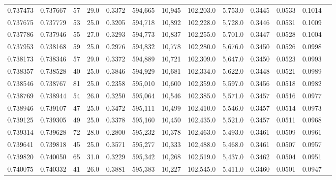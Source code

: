 \begin{tabular}{rrrrrrrrrrrrr}
0.737473 & 0.737667 &    57 & 29.0 &                                     0.3372 & 594,665 &  10,945 & 102,203.0 &   5,753.0 & 0.3445 & 0.0533 & 0.1014 \\
0.737675 & 0.737779 &    53 & 25.0 &                                     0.3205 & 594,718 &  10,892 & 102,228.0 &   5,728.0 & 0.3446 & 0.0531 & 0.1009 \\
0.737786 & 0.737946 &    55 & 27.0 &                                     0.3293 & 594,773 &  10,837 & 102,255.0 &   5,701.0 & 0.3447 & 0.0528 & 0.1004 \\
0.737953 & 0.738168 &    59 & 25.0 &                                     0.2976 & 594,832 &  10,778 & 102,280.0 &   5,676.0 & 0.3450 & 0.0526 & 0.0998 \\
0.738173 & 0.738346 &    57 & 29.0 &                                     0.3372 & 594,889 &  10,721 & 102,309.0 &   5,647.0 & 0.3450 & 0.0523 & 0.0993 \\
0.738357 & 0.738528 &    40 & 25.0 &                                     0.3846 & 594,929 &  10,681 & 102,334.0 &   5,622.0 & 0.3448 & 0.0521 & 0.0989 \\
0.738546 & 0.738767 &    81 & 25.0 &                                     0.2358 & 595,010 &  10,600 & 102,359.0 &   5,597.0 & 0.3456 & 0.0518 & 0.0982 \\
0.738769 & 0.738944 &    54 & 26.0 &                                     0.3250 & 595,064 &  10,546 & 102,385.0 &   5,571.0 & 0.3457 & 0.0516 & 0.0977 \\
0.738946 & 0.739107 &    47 & 25.0 &                                     0.3472 & 595,111 &  10,499 & 102,410.0 &   5,546.0 & 0.3457 & 0.0514 & 0.0973 \\
0.739125 & 0.739305 &    49 & 25.0 &                                     0.3378 & 595,160 &  10,450 & 102,435.0 &   5,521.0 & 0.3457 & 0.0511 & 0.0968 \\
0.739314 & 0.739628 &    72 & 28.0 &                                     0.2800 & 595,232 &  10,378 & 102,463.0 &   5,493.0 & 0.3461 & 0.0509 & 0.0961 \\
0.739641 & 0.739818 &    45 & 25.0 &                                     0.3571 & 595,277 &  10,333 & 102,488.0 &   5,468.0 & 0.3461 & 0.0507 & 0.0957 \\
0.739820 & 0.740050 &    65 & 31.0 &                                     0.3229 & 595,342 &  10,268 & 102,519.0 &   5,437.0 & 0.3462 & 0.0504 & 0.0951 \\
0.740075 & 0.740332 &    41 & 26.0 &                                     0.3881 & 595,383 &  10,227 & 102,545.0 &   5,411.0 & 0.3460 & 0.0501 & 0.0947 \\

\end{tabular}
